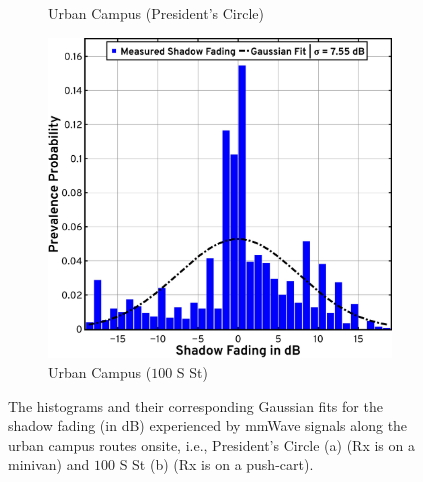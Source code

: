 \documentclass[10pt, twocolumn]{IEEEtran}
\begin{document}
{\begin{figure} [t]
\begin{subfigure}{0.4965\linewidth}
        \caption{Urban Campus (President's Circle)}
        \label{F9a}
    \end{subfigure}
    \begin{subfigure}{0.4935\linewidth}
        \centering
        \includegraphics[width=1.0\linewidth]{figs/urban_campus_shadow_fading_2.pdf}
        \caption{Urban Campus ($100$ S St)}
        \label{F9b}
    \end{subfigure}
    \vspace{-8mm}
    \caption{The histograms and their corresponding Gaussian fits for the shadow fading (in dB) experienced by mmWave signals along the urban campus routes onsite, i.e., President's Circle (a) (Rx is on a minivan) and $100$ S St (b) (Rx is on a push-cart).}
    \label{F9}
\end{figure}

}
\end{document}
